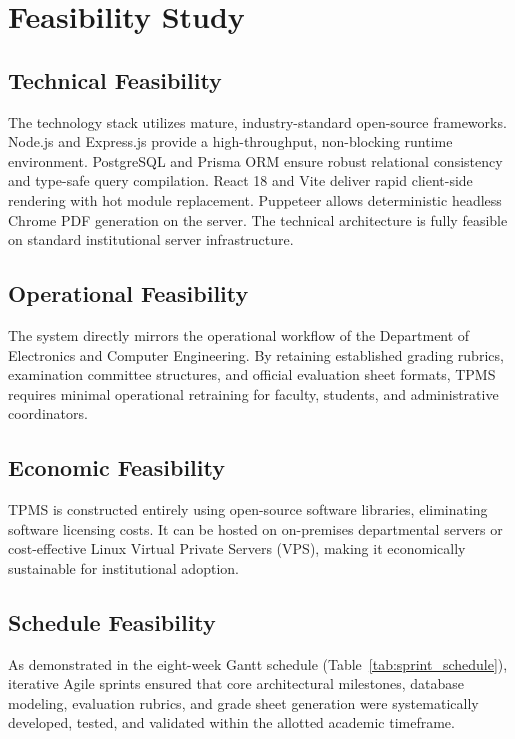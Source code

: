\section{Feasibility Study}

\subsection{Technical Feasibility}
The technology stack utilizes mature, industry-standard open-source frameworks. Node.js and Express.js provide a high-throughput, non-blocking runtime environment. PostgreSQL and Prisma ORM ensure robust relational consistency and type-safe query compilation. React 18 and Vite deliver rapid client-side rendering with hot module replacement. Puppeteer allows deterministic headless Chrome PDF generation on the server. The technical architecture is fully feasible on standard institutional server infrastructure.

\subsection{Operational Feasibility}
The system directly mirrors the operational workflow of the Department of Electronics and Computer Engineering. By retaining established grading rubrics, examination committee structures, and official evaluation sheet formats, TPMS requires minimal operational retraining for faculty, students, and administrative coordinators.

\subsection{Economic Feasibility}
TPMS is constructed entirely using open-source software libraries, eliminating software licensing costs. It can be hosted on on-premises departmental servers or cost-effective Linux Virtual Private Servers (VPS), making it economically sustainable for institutional adoption.

\subsection{Schedule Feasibility}
As demonstrated in the eight-week Gantt schedule (Table~\ref{tab:sprint_schedule}), iterative Agile sprints ensured that core architectural milestones, database modeling, evaluation rubrics, and grade sheet generation were systematically developed, tested, and validated within the allotted academic timeframe.

